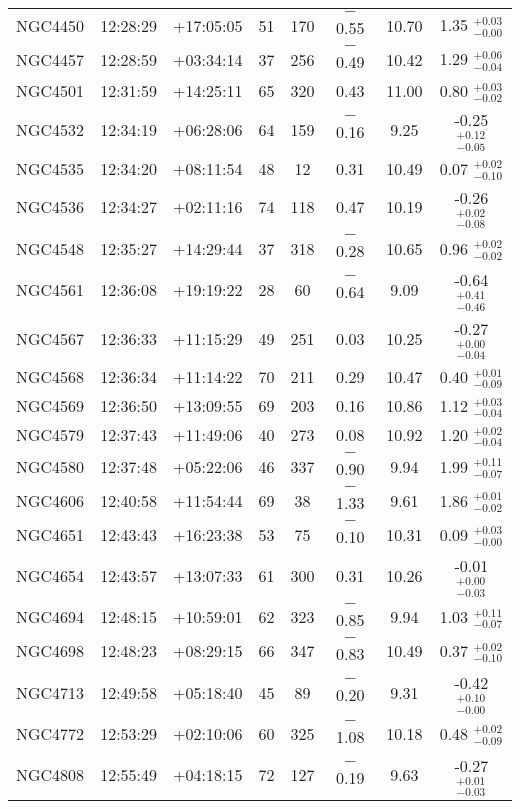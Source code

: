 \documentclass[longauth]{aa}
\begin{document}
\begin{table*}
\begin{tabular}{lccccccc}
NGC4450 & 12:28:29 & +17:05:05 & 51 & 170 & $-$0.55 & 10.70 & 1.35 $^{+ 0.03} _{- 0.00}$\\
NGC4457 & 12:28:59 & +03:34:14 & 37 & 256 & $-$0.49 & 10.42 & 1.29 $^{+ 0.06} _{- 0.04}$\\
NGC4501 & 12:31:59 & +14:25:11 & 65 & 320 & 0.43 & 11.00 & 0.80 $^{+ 0.03} _{- 0.02}$\\
NGC4532 & 12:34:19 & +06:28:06 & 64 & 159 & $-$0.16 & 9.25 & -0.25 $^{+ 0.12 } _{- 0.05}$\\
NGC4535 & 12:34:20 & +08:11:54 & 48 & 12 & 0.31 & 10.49 & 0.07 $^{+ 0.02 } _{- 0.10}$\\
NGC4536 & 12:34:27 & +02:11:16 & 74 & 118 & 0.47 & 10.19 & -0.26 $^{+ 0.02 } _{- 0.08}$\\
NGC4548 & 12:35:27 & +14:29:44 & 37 & 318 & $-$0.28 & 10.65 & 0.96 $^{+ 0.02 } _{- 0.02}$\\
NGC4561 & 12:36:08 & +19:19:22 & 28 & 60 & $-$0.64 & 9.09 & -0.64 $^{+ 0.41} _{- 0.46}$\\
NGC4567 & 12:36:33 & +11:15:29 & 49 & 251 & 0.03 & 10.25 & -0.27 $^{+ 0.00} _{- 0.04}$\\
NGC4568 & 12:36:34 & +11:14:22 & 70 & 211 & 0.29 & 10.47 & 0.40 $^{+ 0.01} _{- 0.09}$\\
NGC4569 & 12:36:50 & +13:09:55 & 69 & 203 & 0.16 & 10.86 & 1.12 $^{+ 0.03} _{- 0.04}$\\
NGC4579 & 12:37:43 & +11:49:06 & 40 & 273 & 0.08 & 10.92 & 1.20 $^{+ 0.02} _{- 0.04}$\\
NGC4580 & 12:37:48 & +05:22:06 & 46 & 337 & $-$0.90 & 9.94 & 1.99 $^{+ 0.11} _{- 0.07}$\\
NGC4606 & 12:40:58 & +11:54:44 & 69 & 38 & $-$1.33 & 9.61 & 1.86 $^{+ 0.01} _{- 0.02}$\\
NGC4651 & 12:43:43 & +16:23:38 & 53 & 75 & $-$0.10 & 10.31 & 0.09 $^{+ 0.03} _{- 0.00}$\\
NGC4654 & 12:43:57 & +13:07:33 & 61 & 300 & 0.31 & 10.26 & -0.01 $^{+ 0.00} _{- 0.03}$\\
NGC4694 & 12:48:15 & +10:59:01 & 62 & 323 & $-$0.85 & 9.94 & 1.03 $^{+ 0.11} _{- 0.07}$\\
NGC4698 & 12:48:23 & +08:29:15 & 66 & 347 & $-$0.83 & 10.49 & 0.37 $^{+ 0.02} _{- 0.10}$\\
NGC4713 & 12:49:58 & +05:18:40 & 45 & 89 & $-$0.20 & 9.31 & -0.42 $^{+ 0.10} _{- 0.00}$\\
NGC4772 & 12:53:29 & +02:10:06 & 60 & 325 & $-$1.08 & 10.18 & 0.48 $^{+ 0.02} _{- 0.09}$\\
NGC4808 & 12:55:49 & +04:18:15 & 72 & 127 & $-$0.19 & 9.63 & -0.27 $^{+ 0.01} _{- 0.03}$\\
\hline
\end{tabular}


\end{table*}
\end{document}

